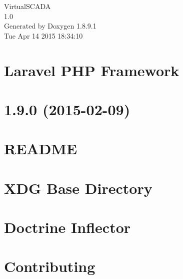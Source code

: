 \documentclass[twoside]{book}
\newcommand{\+}{\discretionary{\mbox{\scriptsize$\hookleftarrow$}}{}{}}
\newcommand{\clearemptydoublepage}{%
  \newpage{\pagestyle{empty}\cleardoublepage}%
}
\begin{document}
\begin{titlepage}
\vspace*{7cm}
\begin{center}%
{\Large Virtual\+S\+C\+A\+D\+A \\[1ex]\large 1.\+0 }\\
\vspace*{1cm}
{\large Generated by Doxygen 1.8.9.1}\\
\vspace*{0.5cm}
{\small Tue Apr 14 2015 18:34:10}\\
\end{center}
\end{titlepage}
\clearemptydoublepage
\tableofcontents
\clearemptydoublepage
{}

\chapter{Laravel P\+H\+P Framework}
\label{md_readme}

\chapter{1.9.0 (2015-\/02-\/09)}
\label{md_vendor_danielstjules_stringy__c_h_a_n_g_e_l_o_g}

\chapter{R\+E\+A\+D\+M\+E}
\label{md_vendor_danielstjules_stringy__r_e_a_d_m_e}

\chapter{X\+D\+G Base Directory}
\label{md_vendor_dnoegel_php-xdg-base-dir__r_e_a_d_m_e}

\chapter{Doctrine Inflector}
\label{md_vendor_doctrine_inflector__r_e_a_d_m_e}

\chapter{Contributing}
\label{md_vendor_doctrine_instantiator__c_o_n_t_r_i_b_u_t_i_n_g}

\end{document}
